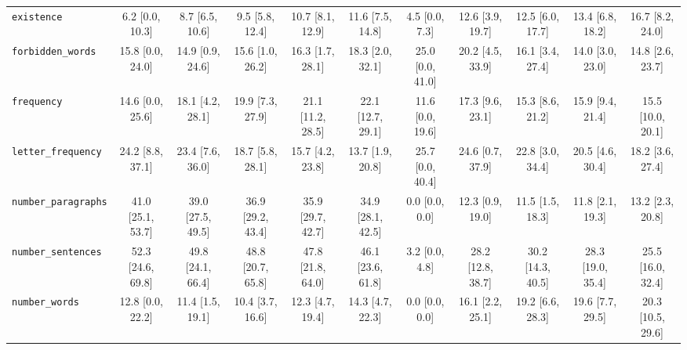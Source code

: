 \begin{table}[h]
{\begin{tabular}{lcccccccccc}
\texttt{existence} & 6.2 [0.0, 10.3] & 8.7 [6.5, 10.6] & 9.5 [5.8, 12.4] & 10.7 [8.1, 12.9] & 11.6 [7.5, 14.8] & 4.5 [0.0, 7.3] & 12.6 [3.9, 19.7] & 12.5 [6.0, 17.7] & 13.4 [6.8, 18.2] & 16.7 [8.2, 24.0] \\
\texttt{forbidden\_words} & 15.8 [0.0, 24.0] & 14.9 [0.9, 24.6] & 15.6 [1.0, 26.2] & 16.3 [1.7, 28.1] & 18.3 [2.0, 32.1] & 25.0 [0.0, 41.0] & 20.2 [4.5, 33.9] & 16.1 [3.4, 27.4] & 14.0 [3.0, 23.0] & 14.8 [2.6, 23.7] \\
\texttt{frequency} & 14.6 [0.0, 25.6] & 18.1 [4.2, 28.1] & 19.9 [7.3, 27.9] & 21.1 [11.2, 28.5] & 22.1 [12.7, 29.1] & 11.6 [0.0, 19.6] & 17.3 [9.6, 23.1] & 15.3 [8.6, 21.2] & 15.9 [9.4, 21.4] & 15.5 [10.0, 20.1] \\
\texttt{letter\_frequency} & 24.2 [8.8, 37.1] & 23.4 [7.6, 36.0] & 18.7 [5.8, 28.1] & 15.7 [4.2, 23.8] & 13.7 [1.9, 20.8] & 25.7 [0.0, 40.4] & 24.6 [0.7, 37.9] & 22.8 [3.0, 34.4] & 20.5 [4.6, 30.4] & 18.2 [3.6, 27.4] \\
\texttt{number\_paragraphs} & 41.0 [25.1, 53.7] & 39.0 [27.5, 49.5] & 36.9 [29.2, 43.4] & 35.9 [29.7, 42.7] & 34.9 [28.1, 42.5] & 0.0 [0.0, 0.0] & 12.3 [0.9, 19.0] & 11.5 [1.5, 18.3] & 11.8 [2.1, 19.3] & 13.2 [2.3, 20.8] \\
\texttt{number\_sentences} & 52.3 [24.6, 69.8] & 49.8 [24.1, 66.4] & 48.8 [20.7, 65.8] & 47.8 [21.8, 64.0] & 46.1 [23.6, 61.8] & 3.2 [0.0, 4.8] & 28.2 [12.8, 38.7] & 30.2 [14.3, 40.5] & 28.3 [19.0, 35.4] & 25.5 [16.0, 32.4] \\
\texttt{number\_words} & 12.8 [0.0, 22.2] & 11.4 [1.5, 19.1] & 10.4 [3.7, 16.6] & 12.3 [4.7, 19.4] & 14.3 [4.7, 22.3] & 0.0 [0.0, 0.0] & 16.1 [2.2, 25.1] & 19.2 [6.6, 28.3] & 19.6 [7.7, 29.5] & 20.3 [10.5, 29.6] \\
\bottomrule
\end{tabular}
}
\end{table}

